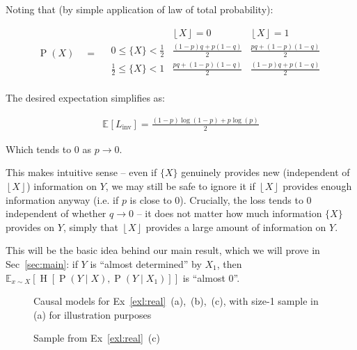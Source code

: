 \documentclass[12pt]{article}
\newcommand{\Ent}[1]{\operatorname{H}\left[#1\right]}
\newcommand{\E}[2][{}]{\mathbb{E}_{#1}\left[#2\right]}
\newcommand{\Prob}[1]{\operatorname{P}\left(#1\right)}
\newcommand{\floor}[1]{\left\lfloor #1 \right\rfloor}
\theoremstyle{definition}
\numberwithin{equation}{section}
\numberwithin{figure}{section}
\numberwithin{table}{section}
\begin{document}
Noting that (by simple application of law of total probability):

\begin{equation*}
    \Prob{X} \,\,\,\,\,\, = \,\,\,\,\,\,
    \begin{array}{l|rr}
         & \floor{X} = 0 & \floor{X} = 1 \\
         \hline
         0 \le \{X\} < \frac12 & 
         \frac{(1-p)q+p(1-q)}{2} & 
         \frac{pq+(1-p)(1-q)}{2} \\
         \frac12 \le \{X\} < 1 & 
         \frac{pq+(1-p)(1-q)}{2} &  
         \frac{(1-p)q+p(1-q)}{2} \\
    \end{array} 
\end{equation*}

The desired expectation simplifies as:

\begin{align*}
    \E{L_{\operatorname{inv}}} =
    \frac{(1-p)\log(1-p) + p \log(p)}{2}
\end{align*}

Which tends to 0 as $p\to 0$. 

This makes intuitive sense -- even if $\{X\}$ genuinely provides new (independent of $\floor{X}$) information on $Y$, we may still be safe to ignore it if $\floor{X}$ provides enough information anyway (i.e. if $p$ is close to 0). Crucially, the loss tends to 0 independent of whether $q\to 0$ -- it does not matter how much information $\{X\}$ provides on $Y$, simply that $\floor{X}$ provides a large amount of information on $Y$.

This will be the basic idea behind our main result, which we will prove in Sec~\ref{sec:main}: if $Y$ is ``almost determined'' by $X_1$, then $\E[x\sim X]{\Ent{\Prob{Y\mid X}, \Prob{Y\mid X_1}}}$ is ``almost 0''.
    
\begin{figure}
    \centering
    
    \caption{Causal models for Ex~\ref{exl:real}~(a),~(b),~(c), with size-1 sample in (a) for illustration purposes}
    \label{fig:real}
\end{figure}

\begin{figure}
    \centering
    
    \caption{Sample from Ex~\ref{exl:real}~(c)}
    \label{fig:real-sample}
\end{figure}
\end{document}

